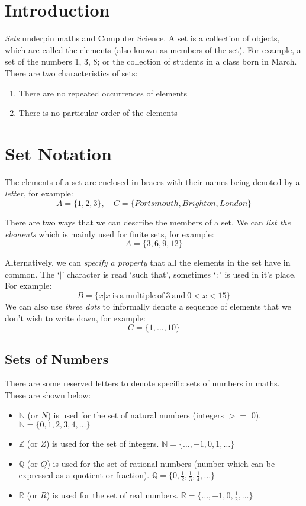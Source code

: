 
\section{Introduction}
\textit{Sets} underpin maths and Computer Science. A set is a collection of objects, which are called the elements (also known as members of the set). For example, a set of the numbers 1, 3, 8; or the collection of students in a class born in March. There are two characteristics of sets:
\begin{enumerate}
    \item There are no repeated occurrences of elements
    \item There is no particular order of the elements
\end{enumerate}

\section{Set Notation}
The elements of a set are enclosed in braces with their names being denoted by a \textit{letter}, for example:
\[A = \{1, 2, 3\}, \quad C=\{Portsmouth, Brighton, London\}\]

There are two ways that we can describe the members of a set. We can \textit{list the elements} which is mainly used for finite sets, for example:
\[A = \{3, 6, 9, 12\}\]

Alternatively, we can \textit{specify a property} that all the elements in the set have in common. The `$|$' character is read `such that', sometimes `$:$' is used in it's place. For example:
\[B = \{x | x \mathrm{\ is\ a\ multiple\ of\ 3\ and\ } 0 < x < 15\}\]
We can also use \textit{three dots} to informally denote a sequence of elements that we don't wish to write down, for example:
\[C = \{1, \ldots, 10\}\]

\subsection{Sets of Numbers}
There are some reserved letters to denote specific sets of numbers in maths. These are shown below:
\begin{itemize}
    \item $\mathbb{N}$ (or $N$) is used for the set of natural numbers (integers $>=$ 0). $\mathbb{N} = \{0, 1, 2, 3, 4, \ldots \}$
    \item $\mathbb{Z}$ (or $Z$) is used for the set of integers. $\mathbb{N} = \{\ldots, -1, 0, 1, \ldots \}$
    \item $\mathbb{Q}$ (or $Q$) is used for the set of rational numbers (number which can be expressed as a quotient or fraction). $\displaystyle \mathbb{Q} = \{0, \frac{1}{2}, \frac{1}{3}, \frac{1}{4}, \ldots \}$
    \item $\mathbb{R}$ (or $R$) is used for the set of real numbers. $\mathbb{R} = \{\displaystyle \ldots, -1, 0, \frac{1}{2}, \ldots \}$
\end{itemize}


